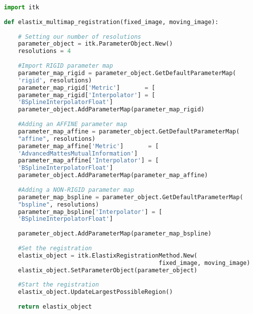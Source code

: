 \documentclass{standalone}
\begin{document}
\lstset{style=python}
	\begin{lstlisting}[language=python, caption=Multimap Registration Function, label=multimap_registration]
import itk
	
def elastix_multimap_registration(fixed_image, moving_image):
    
    # Setting our number of resolutions
    parameter_object = itk.ParameterObject.New()
    resolutions = 4
    
    #Import RIGID parameter map
    parameter_map_rigid = parameter_object.GetDefaultParameterMap(
    'rigid', resolutions)
    parameter_map_rigid['Metric']       = [                                    'AdvancedMattesMutualInformation']
    parameter_map_rigid['Interpolator'] = [
    'BSplineInterpolatorFloat']
    parameter_object.AddParameterMap(parameter_map_rigid)
    
    #Adding an AFFINE parameter map
    parameter_map_affine = parameter_object.GetDefaultParameterMap(
    "affine", resolutions)
    parameter_map_affine['Metric']       = [
    'AdvancedMattesMutualInformation']
    parameter_map_affine['Interpolator'] = [
    'BSplineInterpolatorFloat']
    parameter_object.AddParameterMap(parameter_map_affine)
    
    #Adding a NON-RIGID parameter map
    parameter_map_bspline = parameter_object.GetDefaultParameterMap(
    "bspline", resolutions)
    parameter_map_bspline['Interpolator'] = [
    'BSplineInterpolatorFloat']
    
    parameter_object.AddParameterMap(parameter_map_bspline)
    
    #Set the registration
    elastix_object = itk.ElastixRegistrationMethod.New(
                                            fixed_image, moving_image)
    elastix_object.SetParameterObject(parameter_object)
    
    #Start the registration
    elastix_object.UpdateLargestPossibleRegion()
    
    return elastix_object
\end{lstlisting}
\end{document}
